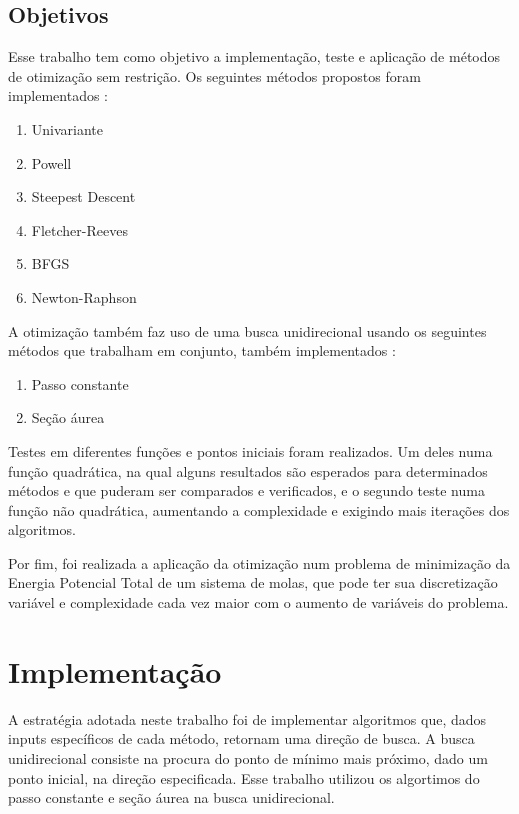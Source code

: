 \documentclass[10pt, a4paper]{article}
\begin{document}
\subsection{Objetivos}

Esse trabalho tem como objetivo a implementação, teste e aplicação de métodos de otimização sem restrição.
Os seguintes métodos propostos foram implementados :
\renewcommand{\theenumi}{\alph{enumi}}
\begin{enumerate}
  \item Univariante
  \item Powell
  \item Steepest Descent
  \item Fletcher-Reeves
  \item BFGS
  \item Newton-Raphson
\end{enumerate}

A otimização também faz uso de uma busca unidirecional usando os seguintes métodos que trabalham em conjunto, também implementados :

\begin{enumerate}
  \item Passo constante
  \item Seção áurea
\end{enumerate}

Testes em diferentes funções e pontos iniciais foram realizados. Um deles numa função quadrática,
na qual alguns resultados são esperados para determinados métodos e que puderam ser comparados e verificados, 
e o segundo teste numa função não quadrática, aumentando a complexidade e exigindo mais iterações dos algoritmos.

Por fim, foi realizada a aplicação da otimização num problema de minimização da Energia Potencial Total de um sistema de molas,
que pode ter sua discretização variável e complexidade cada vez maior com o aumento de variáveis do problema.

\section{Implementação}

A estratégia adotada neste trabalho foi de implementar algoritmos que, dados inputs específicos de cada método, retornam uma direção de busca. A busca unidirecional consiste na procura 
do ponto de mínimo mais próximo, dado um ponto inicial, na direção especificada. Esse trabalho utilizou os algortimos do passo constante e seção áurea na busca unidirecional.
\end{document}
